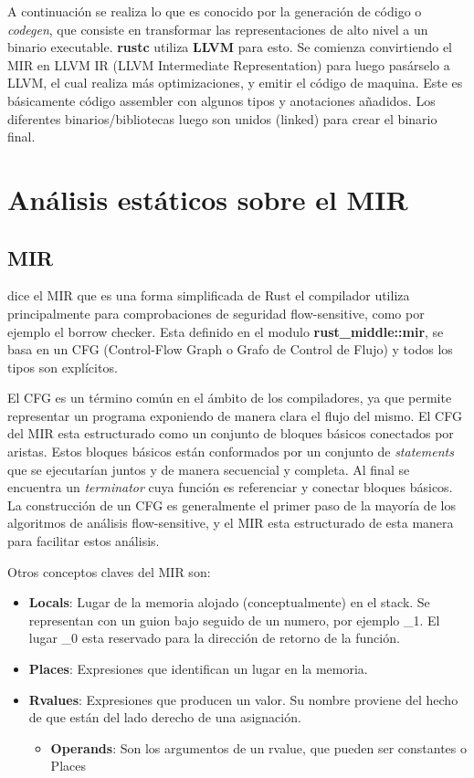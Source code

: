 A continuación se realiza lo que es conocido por la generación de código o \textit{codegen}, que consiste en transformar las representaciones de alto nivel a un binario executable. \textbf{rustc} utiliza \textbf{LLVM} para esto. Se comienza convirtiendo el MIR en LLVM IR (LLVM Intermediate Representation) para luego pasárselo a LLVM, el cual realiza más optimizaciones, y emitir el código de maquina. Este es básicamente código assembler con algunos tipos y anotaciones añadidos. Los diferentes binarios/bibliotecas luego son unidos (linked) para crear el binario final.

\section{Análisis estáticos sobre el MIR}

\subsection{MIR}

\cite{rustcdevelopment} dice el MIR que es una forma simplificada de Rust el compilador utiliza principalmente para comprobaciones de seguridad flow-sensitive, como por ejemplo el borrow checker. Esta definido en el modulo \textbf{rust\_middle::mir}, se basa en un CFG (Control-Flow Graph o Grafo de Control de Flujo) y todos los tipos son explícitos.

El CFG es un término común en el ámbito de los compiladores, ya que permite representar un programa exponiendo de manera clara el flujo del mismo. El CFG del MIR esta estructurado como un conjunto de bloques básicos conectados por aristas. Estos bloques básicos están conformados por un conjunto de \textit{statements} que se ejecutarían juntos y de manera secuencial y completa. Al final se encuentra un \textit{terminator} cuya función es referenciar y conectar bloques básicos. La construcción de un CFG es generalmente el primer paso de la mayoría de los algoritmos de análisis flow-sensitive, y el MIR esta estructurado de esta manera para facilitar estos análisis.

Otros conceptos claves del MIR son:
\begin{itemize}
    \item \textbf{Locals}: Lugar de la memoria alojado (conceptualmente) en el stack. Se representan con un guion bajo seguido de un numero, por ejemplo \_1. El lugar \_0 esta reservado para la dirección de retorno de la función.
    \item \textbf{Places}: Expresiones que identifican un lugar en la memoria.
    \item \textbf{Rvalues}: Expresiones que producen un valor. Su nombre proviene del hecho de que están del lado derecho de una asignación.
    \begin{itemize}
        \item \textbf{Operands}: Son los argumentos de un rvalue, que pueden ser constantes o Places
    \end{itemize}
\end{itemize}

